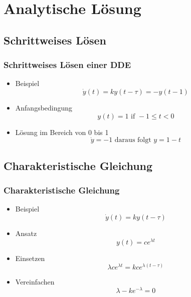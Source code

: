 \documentclass{beamer}
\begin{document}
\section{Analytische Lösung}

\subsection{Schrittweises Lösen}
\begin{frame}
	\frametitle{Schrittweises Lösen einer DDE}
	\begin{itemize}
		\item[] Beispiel
			\begin{equation}
			\dot{y}(t)=ky(t-\tau)=-y(t-1)
			\end{equation} 
			\pause
		\item[] Anfangsbedingung
			\begin{equation}
			y(t)=1 \textrm{ if }	-1\le t<0
			\end{equation}
			\pause
		\item[] Lösung im Bereich von 0 bis 1 
		 	\pause
		 	\begin{equation}
		 	\dot{y}=-1 \textrm{   daraus folgt  } y=1-t
		 	\end{equation} 	
	\end{itemize}
\end{frame}

\subsection{Charakteristische Gleichung}
\begin{frame}
\frametitle{Charakteristische Gleichung}
\begin{itemize}
	\item[] Beispiel
	\begin{equation}
	\dot{y}(t)=ky(t-\tau)
	\end{equation} 
	\item[] Ansatz
	\begin{equation}
	y(t) = ce^{\lambda t}
	\end{equation}
	\pause
	\item[] Einsetzen
	\begin{equation}
	\lambda ce^{\lambda t} = kce^{\lambda (t-\tau )}
	\end{equation} 	
	\pause
	\item[] Vereinfachen
	\begin{equation}
	\lambda  - ke^{-\lambda}= 0
	\end{equation}
\end{itemize}
\end{frame}
\end{document}
